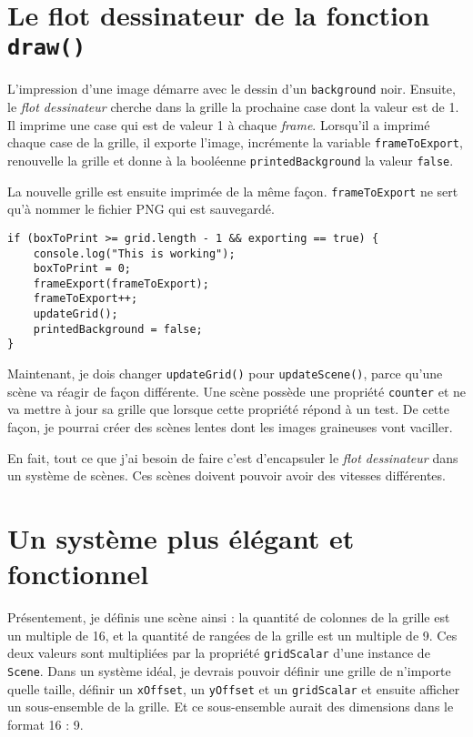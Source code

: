 \newpage
\section{Le flot dessinateur de la fonction \lstinline|draw()|}
\noindent L'impression d'une image démarre avec le dessin d'un \lstinline|background| noir. Ensuite, le \textit{flot dessinateur} cherche dans la grille la prochaine case dont la valeur est de 1. Il imprime une case qui est de valeur 1 à chaque \textit{frame}. Lorsqu'il a imprimé chaque case de la grille, il exporte l'image, incrémente la variable \lstinline|frameToExport|, renouvelle la grille et donne à la booléenne \lstinline|printedBackground| la valeur \lstinline|false|.

La nouvelle grille est ensuite imprimée de la même façon. \lstinline|frameToExport| ne sert qu'à nommer le fichier PNG qui est sauvegardé.
\begin{lstlisting}
if (boxToPrint >= grid.length - 1 && exporting == true) {
    console.log("This is working");
    boxToPrint = 0;
    frameExport(frameToExport);
    frameToExport++;
    updateGrid();
    printedBackground = false;
}
\end{lstlisting}Maintenant, je dois changer \lstinline|updateGrid()| pour \lstinline|updateScene()|, parce qu'une scène va réagir de façon différente. Une scène possède une propriété \lstinline|counter| et ne va mettre à jour sa grille que lorsque cette propriété répond à un test. De cette façon, je pourrai créer des scènes lentes dont les images graineuses vont vaciller.

En fait, tout ce que j'ai besoin de faire c'est d'encapsuler le \textit{flot dessinateur} dans un système de scènes. Ces scènes doivent pouvoir avoir des vitesses différentes.

\newpage
\section{Un système plus élégant et fonctionnel}
Présentement, je définis une scène ainsi : la quantité de colonnes de la grille est un multiple de 16, et la quantité de rangées de la grille est un multiple de 9. Ces deux valeurs sont multipliées par la propriété \lstinline|gridScalar| d'une instance de \lstinline|Scene|. Dans un système idéal, je devrais pouvoir définir une grille de n'importe quelle taille, définir un \lstinline|xOffset|, un \lstinline|yOffset| et un \lstinline|gridScalar| et ensuite afficher un sous-ensemble de la grille. Et ce sous-ensemble aurait des dimensions dans le format 16 : 9.